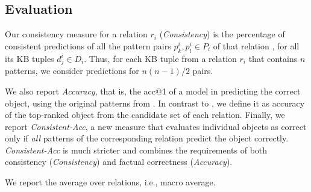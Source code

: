 
\subsection{Evaluation}
\label{sec:eval}


Our consistency measure for a relation $r_i$ (\textit{Consistency}) is the
percentage of consistent predictions of all the pattern pairs
$p_k^i,p_l^i \in P_i$ of that relation , for all its KB tuples
$d^i_j \in D_i$. Thus, for each KB tuple from a relation
$r_i$ that contains $n$ patterns, we consider predictions
for $n(n-1)/2$ pairs.


We also report \textit{Accuracy}, that is, the acc@1 of a model in predicting the correct object, using the original patterns from \citet{lama}. In contrast to \citet{lama}, we define it as accuracy of the top-ranked object from the candidate set of each relation.
Finally, we report \emph{Consistent-Acc}, a new measure that evaluates individual objects as correct only
if \emph{all} patterns of the corresponding relation predict the object
correctly. \textit{Consistent-Acc} is  much stricter  and combines the
requirements of both consistency (\textit{Consistency}) and factual correctness (\textit{Accuracy}).


We report the average
over relations, i.e., macro average.
